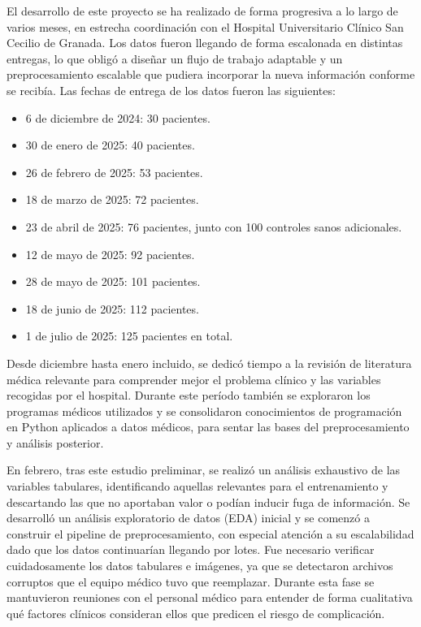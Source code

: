 El desarrollo de este proyecto se ha realizado de forma progresiva a lo largo de varios meses, en estrecha coordinación con el Hospital Universitario Clínico San Cecilio de Granada. Los datos fueron llegando de forma escalonada en distintas entregas, lo que obligó a diseñar un flujo de trabajo adaptable y un preprocesamiento escalable que pudiera incorporar la nueva información conforme se recibía. Las fechas de entrega de los datos fueron las siguientes:

\begin{itemize}
    \item 6 de diciembre de 2024: 30 pacientes.
    \item 30 de enero de 2025: 40 pacientes.
    \item 26 de febrero de 2025: 53 pacientes.
    \item 18 de marzo de 2025: 72 pacientes.
    \item 23 de abril de 2025: 76 pacientes, junto con 100 controles sanos adicionales.
    \item 12 de mayo de 2025: 92 pacientes.
    \item 28 de mayo de 2025: 101 pacientes.
    \item 18 de junio de 2025: 112 pacientes.
    \item 1 de julio de 2025: 125 pacientes en total.
\end{itemize}

Desde diciembre hasta enero incluido, se dedicó tiempo a la revisión de literatura médica relevante para comprender mejor el problema clínico y las variables recogidas por el hospital. Durante este período también se exploraron los programas médicos utilizados y se consolidaron conocimientos de programación en Python aplicados a datos médicos, para sentar las bases del preprocesamiento y análisis posterior.

En febrero, tras este estudio preliminar, se realizó un análisis exhaustivo de las variables tabulares, identificando aquellas relevantes para el entrenamiento y descartando las que no aportaban valor o podían inducir fuga de información. Se desarrolló un análisis exploratorio de datos (EDA) inicial y se comenzó a construir el pipeline de preprocesamiento, con especial atención a su escalabilidad dado que los datos continuarían llegando por lotes. Fue necesario verificar cuidadosamente los datos tabulares e imágenes, ya que se detectaron archivos corruptos que el equipo médico tuvo que reemplazar. Durante esta fase se mantuvieron reuniones con el personal médico para entender de forma cualitativa qué factores clínicos consideran ellos que predicen el riesgo de complicación.


